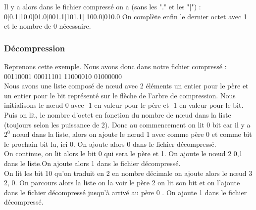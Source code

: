 \documentclass{report}
\begin{document}
\begin{center}
\end{center}	

Il y a alors dans le fichier compressé on a (sans les "." et les "|") :\\ 
0|0.1|10.0|01.0|001.1|101.1| 100.0|010.0 
On complète enfin le dernier octet avec 1 et le nombre de 0 nécessaire. 

\subsubsection{Décompression}
Reprenons cette exemple. 
Nous avons donc dans notre fichier compressé :
00110001 00011101 11000010 01000000 \\
Nous avons une liste composé de nœud avec 2 éléments un entier pour le père et un entier pour le bit représenté sur le flèche de l'arbre de compression. Nous initialisons le nœud 0 avec -1 en valeur pour le père et -1 en valeur pour le bit. 
Puis on lit, le nombre d'octet en fonction du nombre de nœud dans la liste (toujours selon les puissance de 2).
Donc au commencement on lit 0 bit car il y a $2^{0}$ nœud dans la liste, alors on ajoute le nœud 1 avec comme père 0 et comme bit le prochain bit lu, ici 0.
On ajoute alors 0 dans le fichier décompressé. \\
On continue, on lit alors le bit 0 qui sera le père et 1. On ajoute le nœud 2 {0,1} 
dans le liste.On ajoute alors 1 dans le fichier décompressé.\\
On lit les bit 10 qu'on traduit en 2 en nombre décimale on ajoute alors le nœud 3 {2, 0}. On parcours alors la liste on la voir le père 2 on lit son bit et on l'ajoute dans le fichier décompressé jusqu'à arrivé au père 0 . On ajoute 1 dans le fichier décompressé. 
\end{document}
